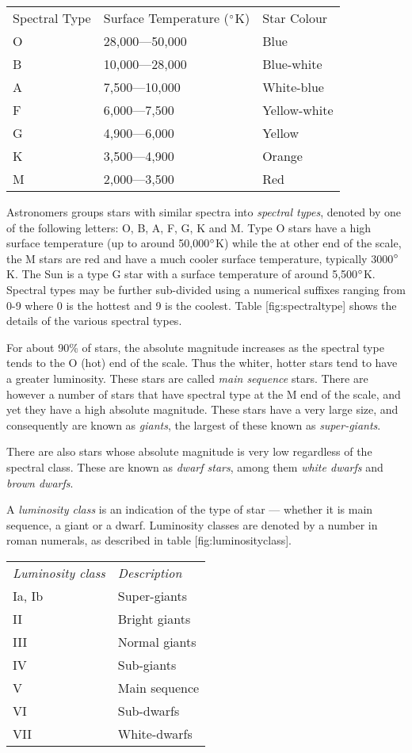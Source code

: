\begin{longtable}[c]{@{}lll@{}}
\toprule
Spectral Type & Surface Temperature ($\degree$K) & Star Colour\tabularnewline
O & 28,000---50,000 & Blue\tabularnewline
B & 10,000---28,000 & Blue-white\tabularnewline
A & 7,500---10,000 & White-blue\tabularnewline
F & 6,000---7,500 & Yellow-white\tabularnewline
G & 4,900---6,000 & Yellow\tabularnewline
K & 3,500---4,900 & Orange\tabularnewline
M & 2,000---3,500 & Red\tabularnewline
\bottomrule
\end{longtable}

Astronomers groups stars with similar spectra into \emph{spectral
types}, denoted by one of the following letters: O, B, A, F, G, K and M.
Type O stars have a high surface temperature (up to around 50,000$\degree$K)
while the at other end of the scale, the M stars are red and have a much
cooler surface temperature, typically 3000$\degree$K. The Sun is a type G star with a surface temperature of around 5,500$\degree$K. Spectral types may be further sub-divided using a numerical suffixes ranging from 0-9 where 0 is the hottest and 9 is the coolest. Table {[}fig:spectraltype{]} shows the details of the various spectral types.

For about 90\% of stars, the absolute magnitude increases as the
spectral type tends to the O (hot) end of the scale. Thus the whiter,
hotter stars tend to have a greater luminosity. These stars are called
\emph{main sequence} stars. There are however a number of stars that
have spectral type at the M end of the scale, and yet they have a high
absolute magnitude. These stars have a very large size, and consequently
are known as \emph{giants}, the largest of these known as
\emph{super-giants}.

There are also stars whose absolute magnitude is very low regardless of
the spectral class. These are known as \emph{dwarf stars}, among them
\emph{white dwarfs} and \emph{brown dwarfs}.

A \emph{luminosity class} is an indication of the type of star ---
whether it is main sequence, a giant or a dwarf. Luminosity classes are
denoted by a number in roman numerals, as described in table
{[}fig:luminosityclass{]}.

\begin{longtable}[c]{@{}ll@{}}
\toprule
\emph{Luminosity class} & \emph{Description}\tabularnewline
Ia, Ib & Super-giants\tabularnewline
II & Bright giants\tabularnewline
III & Normal giants\tabularnewline
IV & Sub-giants\tabularnewline
V & Main sequence\tabularnewline
VI & Sub-dwarfs\tabularnewline
VII & White-dwarfs\tabularnewline
\bottomrule
\end{longtable}

